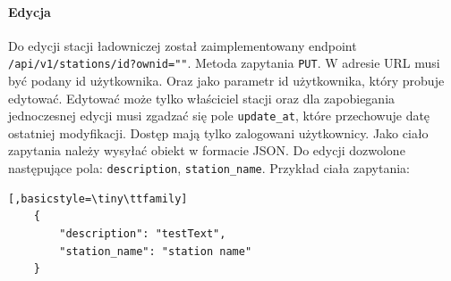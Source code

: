 \paragraph{Edycja\newline}
Do edycji stacji ładowniczej został zaimplementowany endpoint \texttt{/api/v1/stations/{id}?ownid=""}.
Metoda zapytania \texttt{PUT}.
W adresie URL musi być podany id użytkownika. Oraz jako parametr id użytkownika, który probuje edytować. Edytować może tylko właściciel stacji oraz dla zapobiegania jednoczesnej edycji musi zgadzać się pole \texttt{update\_at}, które przechowuje datę ostatniej modyfikacji.
Dostęp mają tylko zalogowani użytkownicy.
Jako ciało zapytania należy wysyłać obiekt w formacie JSON. Do edycji dozwolone następujące pola: \texttt{description}, \texttt{station\_name}.
Przykład ciała zapytania:
\begin{lstlisting}[,basicstyle=\tiny\ttfamily]
    {
		"description": "testText",
		"station_name": "station name"
    }
\end{lstlisting}

